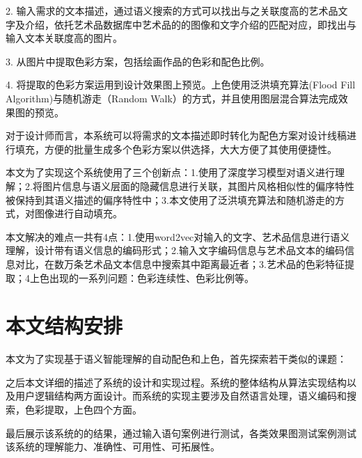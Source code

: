 2. 输入需求的文本描述，通过语义搜索的方式可以找出与之关联度高的艺术品文字及介绍，依托艺术品数据库中艺术品的的图像和文字介绍的匹配对应，即找出与输入文本关联度高的图片。

3. 从图片中提取色彩方案，包括绘画作品的色彩和配色比例。

4. 将提取的色彩方案运用到设计效果图上预览。上色使用泛洪填充算法(Flood Fill Algorithm)与随机游走（Random Walk）的方式，并且使用图层混合算法完成效果图的预览。

对于设计师而言，本系统可以将需求的文本描述即时转化为配色方案对设计线稿进行填充，方便的批量生成多个色彩方案以供选择，大大方便了其使用便捷性。

本文为了实现这个系统使用了三个创新点：1.使用了深度学习模型对语义进行理解；2.将图片信息与语义层面的隐藏信息进行关联，其图片风格相似性的偏序特性被保持到其语义描述的偏序特性中；3.本文使用了泛洪填充算法和随机游走的方式，对图像进行自动填充。

本文解决的难点一共有4点：1.使用word2vec对输入的文字、艺术品信息进行语义理解，设计带有语义信息的编码形式；2.输入文字编码信息与艺术品文本的编码信息对比，在数万条艺术品文本信息中搜索其中距离最近者；3.艺术品的色彩特征提取；4上色出现的一系列问题：色彩连续性、色彩比例等。

\section{本文结构安排}

本文为了实现基于语义智能理解的自动配色和上色，首先探索若干类似的课题：

之后本文详细的描述了系统的设计和实现过程。系统的整体结构从算法实现结构以及用户逻辑结构两方面设计。而系统的实现主要涉及自然语言处理，语义编码和搜索，色彩提取，上色四个方面。

最后展示该系统的的结果，通过输入语句案例进行测试，各类效果图测试案例测试该系统的理解能力、准确性、可用性、可拓展性。



